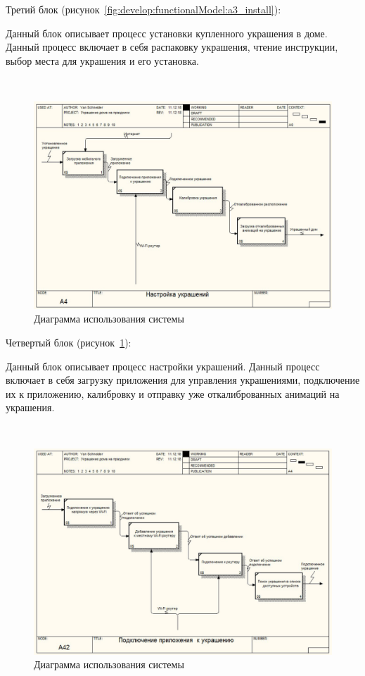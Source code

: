 Третий блок (рисунок~\ref{fig:develop:functionalModel:a3_install}):

Данный блок описывает процесс установки купленного украшения в доме. Данный процесс включает в себя распаковку украшения, чтение инструкции, выбор места для украшения и его установка.

 ~
\begin{figure}[H]
\centering
	\includegraphics[scale=0.6]{figures/functionalModel/a4_settings.jpg}
	\caption{Диаграмма использования системы}
	\label{fig:develop:functionalModel:a4_settings}
\end{figure}

Четвертый блок (рисунок~\ref{fig:develop:functionalModel:a4_settings}):

Данный блок описывает процесс настройки украшений. Данный процесс включает в себя загрузку приложения для управления украшениями, подключение их к приложению, калибровку и отправку уже откалиброванных анимаций на украшения. 

~
\begin{figure}[H]
\centering
	\includegraphics[scale=0.6]{figures/functionalModel/a42_connecting.jpg}
	\caption{Диаграмма использования системы}
	\label{fig:develop:functionalModel:a42_connecting}
\end{figure}

